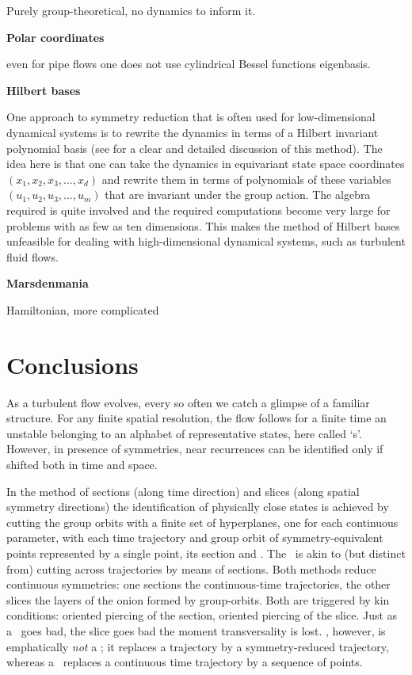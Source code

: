 \documentclass[aip,cha,reprint,
secnumarabic,
nofootinbib, tightenlines,
nobibnotes, showkeys, showpacs,
groupedaddress
]{revtex4-1}
\begin{document}
Purely group-theoretical, no dynamics to inform it.

{\bf Polar coordinates}

even for pipe flows one does not use cylindrical Bessel functions
eigenbasis.

{\bf Hilbert bases}

One approach to symmetry reduction that is often used for low-dimensional
dynamical systems is to rewrite the dynamics in terms of a Hilbert
invariant polynomial basis (see  for a clear and
detailed discussion of this method). The idea here is that one can take
the dynamics in equivariant state space coordinates
$(x_1,x_2,x_3,...,x_d)$ and rewrite them in terms of polynomials of these
variables $(u_1,u_2,u_3,...,u_m)$ that are invariant under the group
action. The algebra required is quite involved and the required
computations become very large for problems with as few as ten
dimensions. This makes the method of Hilbert bases
unfeasible for dealing with high-dimensional dynamical systems, such
as turbulent fluid flows.

{\bf Marsdenmania}

Hamiltonian, more complicated

    \color{black}\fi


\section{Conclusions}
\label{s:concl}

As a turbulent flow evolves, every so often we catch a glimpse of a
familiar structure. For any finite spatial resolution, the flow follows
for a finite time an unstable {\cohStr} belonging to an alphabet of
representative states, here called `\template s'. However, in presence of
symmetries, near recurrences can be identified only if shifted both in
time and space.

In the method of sections (along time direction) and slices (along
spatial symmetry directions) the identification of physically close
states is achieved by cutting the group orbits with a finite set of
hyperplanes, one for each continuous parameter, with each time trajectory
and group orbit of symmetry-equivalent points represented by a single
point, its  section and \slice.
The \mslices\ is akin to (but distinct from) cutting across trajectories
by means of sections. Both methods reduce continuous symmetries: one
sections the continuous-time trajectories, the other slices the layers of
the onion formed by group-orbits. Both are triggered by kin
conditions: oriented piercing of the section, oriented piercing of the slice. Just
as a \PoincSec\ goes bad, the slice goes bad the moment transversality is
lost. \Slice, however, is emphatically \emph{not} a \PoincSec; it
replaces a trajectory by a symmetry-reduced trajectory, whereas a
\PoincSec\ replaces a continuous time trajectory by a sequence of points.
\end{document}
